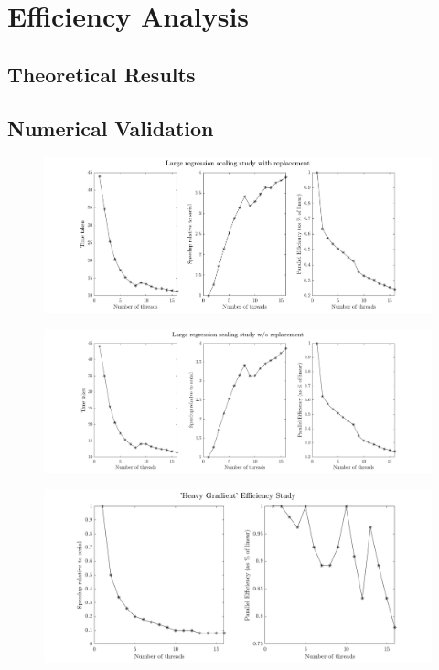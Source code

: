 \section{Efficiency Analysis}

\subsection{Theoretical Results}

\subsection{Numerical Validation}
\begin{figure}[!htb]
  \centering
  \includegraphics[width=1\textwidth]{./resources/replacement}
\end{figure}

\begin{figure}[!htb]
  \centering
  \includegraphics[width=1\textwidth]{./resources/noreplacement}
\end{figure}

\begin{figure}[!htb]
  \centering
  \includegraphics[width=\textwidth]{./resources/heavy_gradient}
\end{figure}
